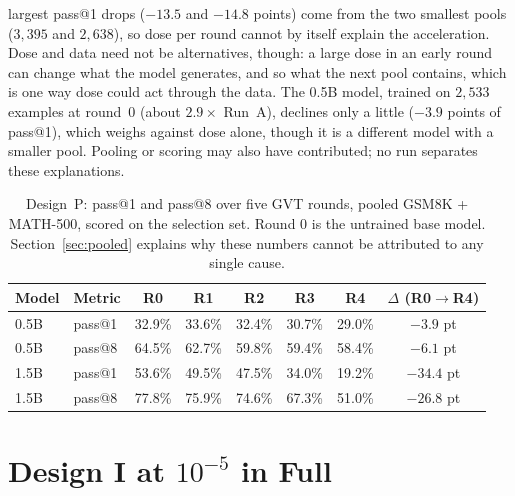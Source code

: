 \documentclass[runningheads]{llncs}
\begin{document}
largest pass@1 drops ($-13.5$ and $-14.8$ points) come from the two smallest
pools ($3{,}395$ and $2{,}638$), so dose per round cannot by itself explain
the acceleration. Dose and data need not be alternatives, though: a large
dose in an early round can change what the model generates, and so what the
next pool contains, which is one way dose could act through the data. The
0.5B model, trained on $2{,}533$ examples at round~0 (about $2.9\times$ Run~A),
declines only a little ($-3.9$ points of pass@1), which weighs against dose
alone, though it is a different model with a smaller pool. Pooling or scoring
may also have contributed; no run separates these explanations.
\begin{table}[!htb]
\caption{Design~P: pass@1 and pass@8 over five GVT rounds, pooled
GSM8K + MATH-500, scored on the selection set. Round 0 is the untrained
base model. Section~\ref{sec:pooled} explains why these numbers cannot
be attributed to any single cause.}
\label{tab:passk}
\centering
\begin{tabular}{llccccc c}
\toprule
Model & Metric & R0 & R1 & R2 & R3 & R4 & $\Delta$ (R0$\to$R4) \\
\midrule
0.5B & pass@1 & 32.9\% & 33.6\% & 32.4\% & 30.7\% & 29.0\% & $-3.9$ pt \\
0.5B & pass@8 & 64.5\% & 62.7\% & 59.8\% & 59.4\% & 58.4\% & $-6.1$ pt \\
1.5B & pass@1 & 53.6\% & 49.5\% & 47.5\% & 34.0\% & 19.2\% & $\mathbf{-34.4}$ pt \\
1.5B & pass@8 & 77.8\% & 75.9\% & 74.6\% & 67.3\% & 51.0\% & $\mathbf{-26.8}$ pt \\
\bottomrule
\end{tabular}
\end{table}

\section{Design I at $10^{-5}$ in Full}
\label{app:isolated}
\end{document}
